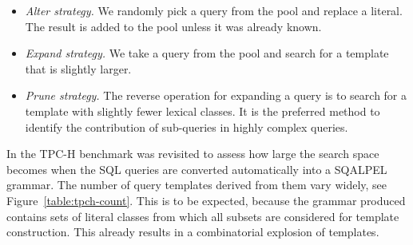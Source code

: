 \documentclass{cidr-2019}
\begin{document}
\begin{itemize}
\item{\emph{Alter strategy.\label{strategies}}}
We randomly pick a query from the pool and replace a literal. The
result is added to the pool unless it was already known.


\item{\emph{Expand strategy.}}  We take a query from the pool and
  search for a template that is slightly larger.

\item{\emph{Prune strategy.}}  The reverse operation for expanding a
  query is to search for a template with slightly fewer lexical
  classes.
It is the preferred method to identify the contribution of sub-queries
in highly complex queries.
\end{itemize}


In \cite{DBLP:conf/sigmod/KerstenKZ18}the TPC-H benchmark was
revisited to assess how large the search space becomes when the SQL
queries are converted automatically into a {\sc SQALPEL} grammar. The
number of query templates derived from them vary widely, see
Figure~\ref{table:tpch-count}.
This is to be expected, because the grammar produced contains sets of
literal classes from which all subsets are considered for template
construction. This already results in a combinatorial explosion of
templates.
\end{document}
